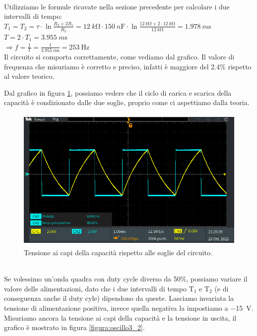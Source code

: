 \documentclass{report}
\begin{document}
\\Utilizziamo le formule ricavate nella sezione precedente per calcolare i due intervalli di tempo:
\\[4pt]\indent$\displaystyle{T_1=T_2=\tau\cdot\ln\frac{R_2+2R_1}{R_2}=\SI{12}{k\ohm}\cdot\SI{150}{n\farad}\cdot\ln\frac{\SI{12}{k\ohm}+2\cdot\SI{12}{k\ohm}}{\SI{12}{k\ohm}}=\SI{1.978}{m\second}}$
\\[4pt]\indent$\displaystyle{T=2\cdot T_1 = \SI{3.955}{m\second}}$
\\[4pt]\indent$\Rightarrow\displaystyle{f=\frac{1}{T}=\frac{1}{\SI{3.955}{m\second}}=\SI{253}{\hertz}}$
\\[4pt]Il circuito si comporta correttamente, come vediamo dal grafico. Il valore di frequenza che misuriamo è corretto e preciso, infatti è maggiore del 2.4\% rispetto al valore teorico.\par
Dal grafico in figura \ref{figura:soglieCap}, possiamo vedere che il ciclo di carica e scarica della capacità è condizionato dalle due soglie, proprio come ci aspettiamo dalla teoria.
\begin{figure}[h!]
	\centering
	\includegraphics[height=7cm]{immagini/TEK00026}
	\caption{Tensione ai capi della capacità rispetto alle soglie del circuito.}
	\label{figura:soglieCap}
\end{figure}
\\Se volessimo un'onda quadra con duty cycle diverso da 50\%, possiamo variare il valore delle alimentazioni, dato che i due intervalli di tempo $\mathrm{T_1}$ e $\mathrm{T_2}$ (e di conseguenza anche il duty cyle) dipendono da queste. Lasciamo invariata la tensione di alimentazione positiva, invece quella negativa la impostiamo a \SI{-15}{\volt}. Misuriamo ancora la tensione ai capi della capacità e la tensione in uscita, il grafico è mostrato in figura \ref{figura:oscillo3_2}.
\end{document}
